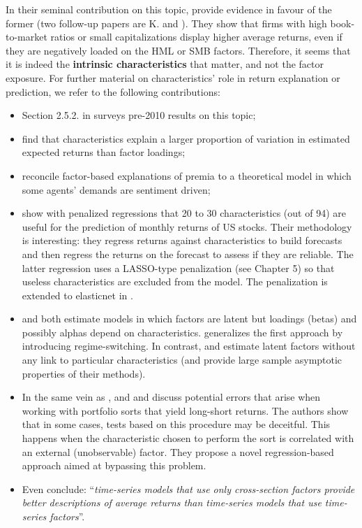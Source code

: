 In their seminal contribution on this topic, \cite{daniel1997evidence} provide evidence in favour of the former (two follow-up papers are K. \cite{daniel2001overconfidence} and \cite{daniel2012testing}). They show that firms with high book-to-market ratios or small capitalizations display higher average returns, even if they are negatively loaded on the HML or SMB factors. Therefore, it seems that it is indeed the \textbf{intrinsic characteristics} that matter, and not the factor exposure. For further material on characteristics' role in return explanation or prediction, we refer to the following contributions:

\begin{itemize}
\item Section 2.5.2. in \cite{goyal2012empirical} surveys pre-2010 results on this topic;
\item \cite{chordia2015cross} find that characteristics explain a larger proportion of variation in estimated expected returns than factor loadings;
\item \cite{kozak2018interpreting} reconcile factor-based explanations of premia to a theoretical model in which some agents' demands are sentiment driven;
\item \cite{han2018firm} show with penalized regressions that 20 to 30 characteristics (out of 94) are useful for the prediction of monthly returns of US stocks. Their methodology is interesting: they regress returns against characteristics to build forecasts and then regress the returns on the forecast to assess if they are reliable. The latter regression uses a LASSO-type penalization (see Chapter 5) so that useless characteristics are excluded from the model. The penalization is extended to elasticnet in \cite{rapach2019time}.
\item \cite{kelly2019characteristics} and \cite{kim2019arbitrage} both estimate models in which factors are latent but loadings (betas) and possibly alphas depend on characteristics. \cite{kirby2020firm} generalizes the first approach by introducing regime-switching. In contrast, \cite{lettau2018estimating} and \cite{lettau2018estimating} estimate latent factors without any link to particular characteristics (and provide large sample asymptotic properties of their methods).
\item In the same vein as \cite{hoechle2018correcting}, \cite{gospodinov2019too} and \cite{bryzgalova2019spurious} and discuss potential errors that arise when working with portfolio sorts that yield long-short returns. The authors show that in some cases, tests based on this procedure may be deceitful. This happens when the characteristic chosen to perform the sort is correlated with an external (unobservable) factor. They propose a novel regression-based approach aimed at bypassing this problem.
\item Even \cite{fama2020comparing} conclude: ``\textit{time-series models that use only cross-section factors provide better descriptions of average returns than time-series models that use time-series factors}''.
\end{itemize}

